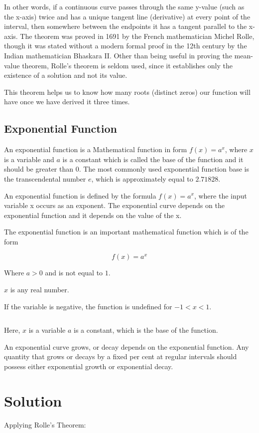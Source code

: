 \documentclass{article}
\begin{document}
    In other words, if a continuous curve passes through the same y-value (such as the x-axis) twice and has a unique tangent line (derivative) at every point of the interval, then somewhere between the endpoints it has a tangent parallel to the x-axis. The theorem was proved in 1691 by the French mathematician Michel Rolle, though it was stated without a modern formal proof in the 12th century by the Indian mathematician Bhaskara II. Other than being useful in proving the mean-value theorem, Rolle’s theorem is seldom used, since it establishes only the existence of a solution and not its value.

    This theorem helps us to know how many roots (distinct zeros) our function will have once we have derived it three times.

    \subsection{Exponential Function}
    An exponential function is a Mathematical function in form $f(x) = a^x$, where $x$ is a variable and $a$ is a constant which is called the base of the function and it should be greater than $0$. The most commonly used exponential function base is the transcendental number $e$, which is approximately equal to $2.71828$.
    
    An exponential function is defined by the formula $f(x) = a^x$, where the input variable x occurs as an exponent. The exponential curve depends on the exponential function and it depends on the value of the x.

    The exponential function is an important mathematical function which is of the form

    $$f(x) = a^x$$

    Where $a > 0$ and is not equal to $1$.

    $x$ is any real number.

    If the variable is negative, the function is undefined for $-1 < x < 1$.

    $$$$

    Here,
    $x$ is a variable
    $a$ is a constant, which is the base of the function.

    An exponential curve grows, or decay depends on the exponential function. Any quantity that grows or decays by a fixed per cent at regular intervals should possess either exponential growth or exponential decay.

    \pagebreak
    \section{Solution}
    Applying Rolle's Theorem:
\end{document}
